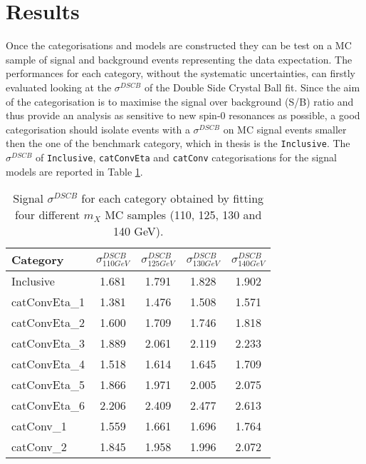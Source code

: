 \documentclass[a4paper, oneside, 11pt, openright]{book}
\begin{document}
 		\section{Results}
 			Once the categorisations and models are constructed they can be test on a MC sample of signal and background events representing the data expectation. The performances for each category, without the systematic uncertainties, can firstly evaluated looking at the $\sigma^{DSCB}$ of the Double Side Crystal Ball fit. Since the aim of the categorisation is to maximise the signal over background (S/B) ratio and thus provide an analysis as sensitive to new spin-0 resonances as possible, a good categorisation should isolate events with a $\sigma^{DSCB}$ on MC signal events smaller then the one of the benchmark category, which in thesis is the \texttt{Inclusive}. The $\sigma^{DSCB}$ of \texttt{Inclusive}, \texttt{catConvEta} and \texttt{catConv} categorisations for the signal models are reported in Table \ref{tab:sigma}.
 			\begin{table}[tbp]
 				\centering
 				\begin{tabular}{lcccc}
 					\toprule[1.5pt]
 					Category		& $\sigma^{DSCB}_{110 GeV}$	& $\sigma^{DSCB}_{125 GeV}$	& $\sigma^{DSCB}_{130 GeV}$ 	& $\sigma^{DSCB}_{140 GeV}$ 	\\
 					\midrule
 					Inclusive 		& 1.681 	& 1.791 	& 1.828 	& 1.902	\\ 
 					\midrule
 					catConvEta\_1 	& 1.381 	& 1.476 	& 1.508 	& 1.571 	\\
 					catConvEta\_2 	& 1.600 	& 1.709  	& 1.746 	& 1.818 	\\ 
 					catConvEta\_3 	& 1.889 	& 2.061 	& 2.119 	& 2.233 	\\ 
 					catConvEta\_4 	& 1.518 	& 1.614 	& 1.645 	& 1.709 	\\ 
 					catConvEta\_5 	& 1.866 	& 1.971 	& 2.005 	& 2.075 	\\ 
 					catConvEta\_6 	& 2.206 	& 2.409 	& 2.477 	& 2.613 	\\
 					\midrule 
 					catConv\_1 		& 1.559 	& 1.661 	& 1.696 	& 1.764 	\\
 					catConv\_2 		& 1.845 	& 1.958 	& 1.996 	& 2.072 	\\
 					\bottomrule[1.5pt]
 				\end{tabular}
 				\caption{Signal $\sigma^{DSCB}$ for each category obtained by fitting four different $m_X$ MC samples (110, 125, 130 and 140 GeV).}
 				\label{tab:sigma}
 			\end{table}
\end{document}
